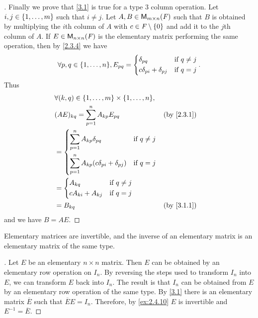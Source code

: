 \begin{proof}[]
  Finally we prove that \cref{3.1} is true for a type 3 column operation.
  Let \(i, j \in \left\lbrace1, \dots, m\right\rbrace\) such that \(i \neq j\).
  Let \(A, B \in \ms\) such that \(B\) is obtained by multiplying the \(i\)th column of \(A\) with \(c \in \mathit{F} \setminus \left\lbrace0\right\rbrace\) and add it to the \(j\)th column of \(A\).
  If \(E \in \ms[n][n][\F]\) is the elementary matrix performing the same operation, then by \cref{2.3.4} we have
  \[
    \forall p, q \in \set{1, \dots, n}, E_{p q} = \begin{dcases}
      \delta_{p q}                  & \text{if } q \neq j \\
      c \delta_{p i} + \delta_{p j} & \text{if } q = j
    \end{dcases}.
  \]
  Thus
  \begin{align*}
     & \forall (k, q) \in \set{1, \dots, m} \times \set{1, \dots, n},                                  \\
     & (AE)_{k q} = \sum_{p = 1}^n A_{k p} E_{p q}                                     &  & \by{2.3.1} \\
     & = \begin{dcases}
           \sum_{p = 1}^n A_{k p} \delta_{p q}                    & \text{if } q \neq j \\
           \sum_{p = 1}^n A_{k p} (c \delta_{p i} + \delta_{p j}) & \text{if } q = j
         \end{dcases}                  \\
     & = \begin{dcases}
           A_{k q}             & \text{if } q \neq j \\
           c A_{k i} + A_{k j} & \text{if } q = j
         \end{dcases}                                                     \\
     & = B_{k q}                                                                       &  & \by{3.1.1}
  \end{align*}
  and we have \(B = AE\).
\end{proof}

\begin{thm}\label{3.2}
  Elementary matrices are invertible, and the inverse of an elementary matrix is an elementary matrix of the same type.
\end{thm}

\begin{proof}[]
  Let \(E\) be an elementary \(n \times n\) matrix.
  Then \(E\) can be obtained by an elementary row operation on \(I_n\).
  By reversing the steps used to transform \(I_n\) into \(E\), we can transform \(E\) back into \(I_n\).
  The result is that \(I_n\) can be obtained from \(E\) by an elementary row operation of the same type.
  By \cref{3.1} there is an elementary matrix \(\overline{E}\) such that \(\overline{E} E = I_n\).
  Therefore, by \cref{ex:2.4.10} \(E\) is invertible and \(E^{-1} = \overline{E}\).
\end{proof}

